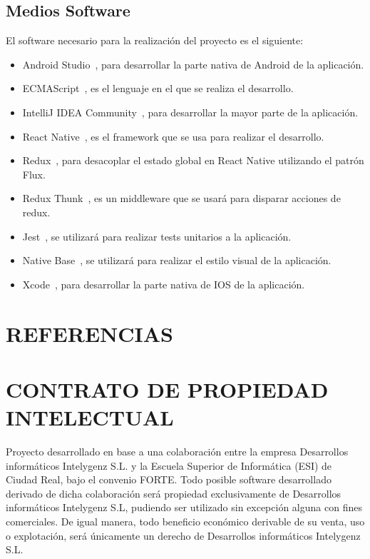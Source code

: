 \documentclass{pre-tfg}
\begin{document}
    \subsection{Medios Software}

    El software necesario para la realización del proyecto es el siguiente:
    \begin{itemize}
        \item Android Studio~\cite{ASTUDIO}, para desarrollar la parte nativa de Android de la aplicación.
        \item ECMAScript~\cite{ECMA}, es el lenguaje en el que se realiza el desarrollo.
        \item IntelliJ IDEA Community~\cite{IDEA}, para desarrollar la mayor parte de la aplicación.
        \item React Native~\cite{RENA}, es el framework que se usa para realizar el desarrollo.
        \item Redux~\cite{REDUX}, para desacoplar el estado global en React Native utilizando el patrón Flux.
        \item Redux Thunk~\cite{THUNK}, es un middleware que se usará para disparar acciones de redux.
        \item Jest~\cite{JEST}, se utilizará para realizar tests unitarios a la aplicación.
        \item Native Base~\cite{NABA}, se utilizará para realizar el estilo visual de la aplicación.
        \item Xcode~\cite{XCODE}, para desarrollar la parte nativa de IOS de la aplicación.
    \end{itemize}


    \section{REFERENCIAS}

    
    \singlespacing
    

    \section{CONTRATO DE PROPIEDAD INTELECTUAL}

    Proyecto desarrollado en base a una colaboración entre la empresa Desarrollos informáticos Intelygenz S.L. y
    la Escuela Superior de Informática (ESI) de Ciudad Real, bajo el convenio FORTE. Todo posible software desarrollado
    derivado de dicha colaboración será propiedad exclusivamente de Desarrollos informáticos Intelygenz S.L, pudiendo ser
    utilizado sin excepción alguna con fines comerciales. De igual manera, todo beneficio económico derivable de su venta,
    uso o explotación, será únicamente un derecho de Desarrollos informáticos Intelygenz S.L.
\end{document}
